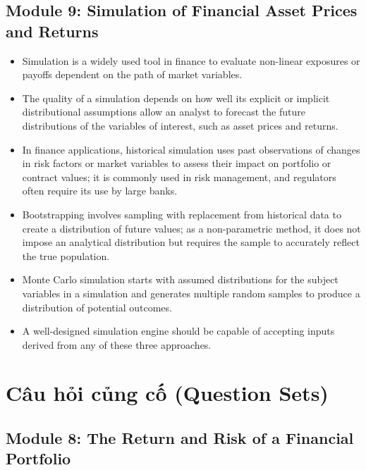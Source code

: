 \newpage

\subsection{Module 9: Simulation of Financial Asset Prices and Returns}
\label{sec:app_Summary_Module_9}

\begin{itemize}
	\item Simulation is a widely used tool in finance to evaluate non-linear exposures or payoffs dependent on the path of market variables.
	\item The quality of a simulation depends on how well its explicit or implicit distributional assumptions allow an analyst to forecast the future distributions of the variables of interest, such as asset prices and returns.
	\item In finance applications, historical simulation uses past observations of changes in risk factors or market variables to assess their impact on portfolio or contract values; it is commonly used in risk management, and regulators often require its use by large banks.
	\item Bootstrapping involves sampling with replacement from historical data to create a distribution of future values; as a non-parametric method, it does not impose an analytical distribution but requires the sample to accurately reflect the true population.
	\item Monte Carlo simulation starts with assumed distributions for the subject variables in a simulation and generates multiple random samples to produce a distribution of potential outcomes.
	\item A well-designed simulation engine should be capable of accepting inputs derived from any of these three approaches.
\end{itemize}

\newpage

\section{Câu hỏi củng cố (Question Sets)}
\label{chap:Question Sets}

\subsection*{Module 8: The Return and Risk of a Financial Portfolio}

